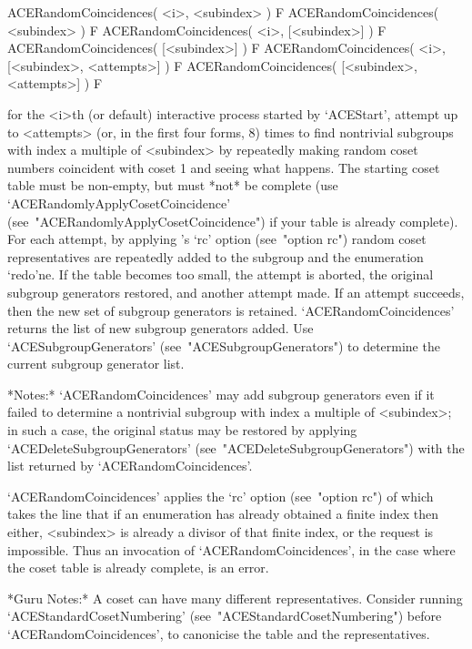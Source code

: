 \>ACERandomCoincidences( <i>, <subindex> ) F
\>ACERandomCoincidences( <subindex> ) F
\>ACERandomCoincidences( <i>, [<subindex>] ) F
\>ACERandomCoincidences( [<subindex>] ) F
\>ACERandomCoincidences( <i>, [<subindex>, <attempts>] ) F
\>ACERandomCoincidences( [<subindex>, <attempts>] ) F

for the <i>th (or  default)  interactive  {\ACE}  process  started  by
`ACEStart', attempt up to <attempts> (or, in the first four forms,  8)
times to find nontrivial subgroups with index a multiple of <subindex>
by repeatedly making random coset numbers coincident with coset 1  and
seeing what happens. The starting coset table must be  non-empty,  but
must  *not*  be   complete   (use   `ACERandomlyApplyCosetCoincidence'
(see~"ACERandomlyApplyCosetCoincidence")  if  your  table  is  already
complete).  For  each  attempt,  by  applying  {\ACE}'s  `rc'   option
(see~"option rc") random coset representatives are repeatedly added to
the subgroup and the enumeration `redo'ne. If the  table  becomes  too
small, the  attempt  is  aborted,  the  original  subgroup  generators
restored, and another attempt made. If an attempt succeeds,  then  the
new set of subgroup generators  is  retained.  `ACERandomCoincidences'
returns   the   list   of   new   subgroup   generators   added.   Use
`ACESubgroupGenerators' (see~"ACESubgroupGenerators") to determine the
current subgroup generator list.

*Notes:* 
`ACERandomCoincidences' may add subgroup generators even if it  failed
to  determine  a  nontrivial  subgroup  with  index  a   multiple   of
<subindex>; in such a case, the original status  may  be  restored  by
applying                                 `ACEDeleteSubgroupGenerators'
(see~"ACEDeleteSubgroupGenerators")  with   the   list   returned   by
`ACERandomCoincidences'.

`ACERandomCoincidences' applies the `rc' option (see~"option  rc")  of
{\ACE} which takes  the  line  that  if  an  enumeration  has  already
obtained a finite index then either, <subindex> is already  a  divisor
of that finite index, or the request is impossible. Thus an invocation
of `ACERandomCoincidences', in the  case  where  the  coset  table  is
already complete, is an error.

*Guru  Notes:*  A  coset  can  have  many  different  representatives.
Consider              running              `ACEStandardCosetNumbering'
(see~"ACEStandardCosetNumbering") before  `ACERandomCoincidences',  to
canonicise the table and the representatives.

